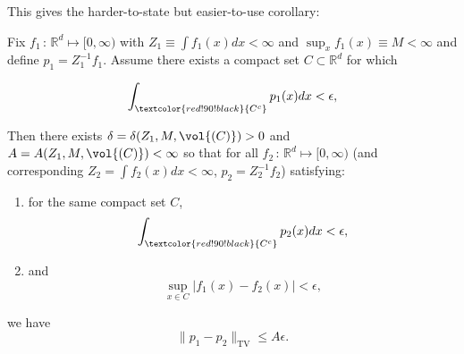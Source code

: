This gives the harder-to-state but easier-to-use corollary:

\begin{lemma}
Fix $f_{1} \,:\, \mathbb{R}^{d} \mapsto [0,\infty)$ with $Z_{1} \equiv \int f_{1}(x) dx < \infty$ and $\sup_{x} f_{1}(x) \equiv M < \infty$ and define $p_{1} = Z_{1}^{-1} f_{1}$. Assume there exists a compact set $C \subset \mathbb{R}^{d}$ for which 

\begin{equation}
\int_{\textcolor{red!90!black}{C^{c}}} p_{1}(x) dx < \epsilon,
\label{eq:CloseEst1}
\end{equation}

\noindent Then there exists $\delta = \delta(Z_{1}, M, \vol{(C)}) > 0$  and $A = A(Z_{1},M, \vol{(C)}) < \infty$ so that for all $f_{2} \,:\, \mathbb{R}^{d} \mapsto [0,\infty)$ (and corresponding $Z_{2} = \int f_{2}(x) dx < \infty$, $p_{2} = Z_{2}^{-1} f_{2}$) satisfying:

\begin{enumerate}
\item for the same compact set $C$,  $$\int_{\textcolor{red!90!black}{C^{c}}} p_{2}(x) dx < \epsilon,$$
\item and
\begin{equation}
\sup_{x \in C} \vert f_{1}(x) - f_{2}(x) \vert < \epsilon,
\label{eq:CloseEst2}
\end{equation}
\end{enumerate}


\noindent we have $$\| p_{1} - p_{2} \|_{\mathrm{TV}} \leq A \epsilon.$$
\end{lemma}


